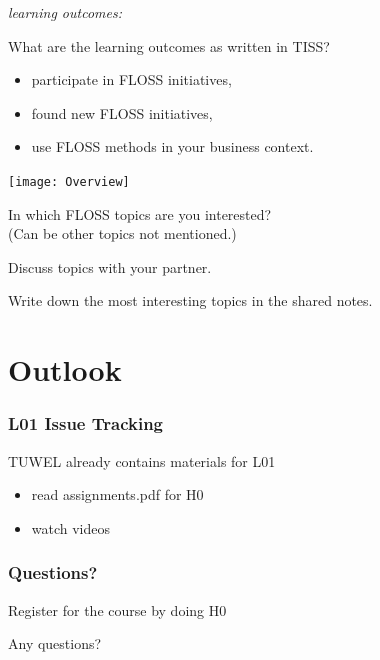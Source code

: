 \begin{frame}
	\textit{learning outcomes:}

	\begin{question}
	What are the learning outcomes as written in TISS?
	\end{question}

	\pause

	\begin{itemize}
		\item participate in FLOSS initiatives,
		\item found new FLOSS initiatives,
		\item use FLOSS methods in your business context.
	\end{itemize}
\end{frame}


\begin{frame}
	\texttt{[image: Overview]}
\end{frame}

\begin{assignment}
	In which FLOSS topics are you interested? \\
	(Can be other topics not mentioned.)

	\begin{task}[1]
	Discuss topics with your partner.
	\end{task}

	\begin{task}[2]
	Write down the most interesting topics in the shared notes.
	\end{task}
\end{assignment}


\section{Outlook}

\begin{frame}
	\frametitle{L01 Issue Tracking}
	TUWEL already contains materials for L01
	\begin{task}
	\begin{itemize}
		\item read assignments.pdf for H0
		\item watch videos
	\end{itemize}
	\end{task}
\end{frame}

\begin{assignment}
	\frametitle{Questions?}
	\begin{task}
	Register for the course by doing H0
	\end{task}

	\begin{task}
	Any questions?
	\end{task}
\end{assignment}




\nocite{raab2017introducing}

\appendix

\begin{frame}[allowframebreaks]
	
	
\end{frame}




